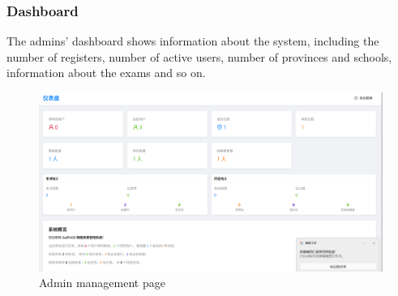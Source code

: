 \documentclass[12pt]{article}
\begin{document}
\subsubsection{Dashboard}
The admins' dashboard shows information about the system, including the number of registers, number of active users, number of provinces and schools,
information about the exams and so on.
\begin{figure}[H]
    \centering
    \includegraphics[width=\textwidth]{admin/dashboard4admin.png}
    \caption{Admin management page}
    \label{fig:adminmanage page}
\end{figure}
\end{document}
